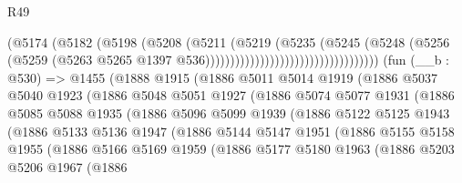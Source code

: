 \begin{lexlean}{R49}
\begin{coremodule}
                                                  (@5174
                                                    (@5182
                                                      (@5198
                                                        (@5208
                                                          (@5211
                                                            (@5219
                                                              (@5235
                                                                (@5245
                                                                  (@5248
                                                                    (@5256
                                                                      (@5259
                                                                        (@5263
                                                                          @5265
                                                                          @1397
                                                                          @536)))))))))))))))))))))))))))))))))))
    (fun (__b : @530) =>
    @1455
      (@1888
        @1915
        (@1886
          @5011
          @5014
          @1919
          (@1886
            @5037
            @5040
            @1923
            (@1886
              @5048
              @5051
              @1927
              (@1886
                @5074
                @5077
                @1931
                (@1886
                  @5085
                  @5088
                  @1935
                  (@1886
                    @5096
                    @5099
                    @1939
                    (@1886
                      @5122
                      @5125
                      @1943
                      (@1886
                        @5133
                        @5136
                        @1947
                        (@1886
                          @5144
                          @5147
                          @1951
                          (@1886
                            @5155
                            @5158
                            @1955
                            (@1886
                              @5166
                              @5169
                              @1959
                              (@1886
                                @5177
                                @5180
                                @1963
                                (@1886
                                  @5203
                                  @5206
                                  @1967
                                  (@1886

\end{coremodule}
\end{lexlean}
